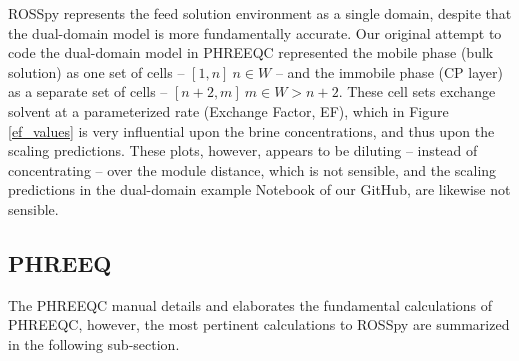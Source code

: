 \begin{supplementary}
ROSSpy represents the feed solution environment as a single domain, despite that the dual-domain model is more fundamentally accurate. Our original attempt to code the dual-domain model in PHREEQC represented the mobile phase (bulk solution) as one set of cells -- $[1,n]~n\in W$ -- and the immobile phase (CP layer) as a separate set of cells -- $[n+2,m]~m \in W>n+2$. These cell sets exchange solvent at a parameterized rate (Exchange Factor, EF), which in Figure \ref{ef_values} is very influential upon the brine concentrations, and thus upon the scaling predictions. These plots, however, appears to be diluting -- instead of concentrating -- over the module distance, which is not sensible, and the scaling predictions in the dual-domain example Notebook of our GitHub, are likewise not sensible. 

\subsection{PHREEQ}
The PHREEQC manual details and elaborates the fundamental calculations of PHREEQC, however, the most pertinent calculations to ROSSpy are summarized in the following sub-section.


\end{supplementary}
